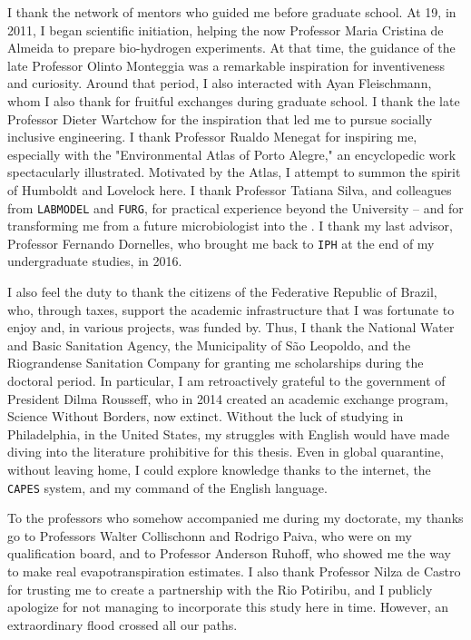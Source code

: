 \documentclass[./main_en.tex]{subfiles}
\begin{document}
\par I thank the network of mentors who guided me before graduate school. At 19, in 2011, I began scientific initiation, helping the now Professor Maria Cristina de Almeida to prepare bio-hydrogen experiments. At that time, the guidance of the late Professor Olinto Monteggia was a remarkable inspiration for inventiveness and curiosity. Around that period, I also interacted with Ayan Fleischmann, whom I also thank for fruitful exchanges during graduate school. I thank the late Professor Dieter Wartchow for the inspiration that led me to pursue socially inclusive engineering. I thank Professor Rualdo Menegat for inspiring me, especially with the "Environmental Atlas of Porto Alegre," an encyclopedic work spectacularly illustrated. Motivated by the Atlas, I attempt to summon the spirit of Humboldt and Lovelock here. I thank Professor Tatiana Silva, and colleagues from \texttt{LABMODEL} and \texttt{FURG}, for practical experience beyond the University -- and for transforming me from a future microbiologist into the . I thank my last advisor, Professor Fernando Dornelles, who brought me back to \texttt{IPH} at the end of my undergraduate studies, in 2016.

\par I also feel the duty to thank the citizens of the Federative Republic of Brazil, who, through taxes, support the academic infrastructure that I was fortunate to enjoy and, in various projects, was funded by. Thus, I thank the National Water and Basic Sanitation Agency, the Municipality of São Leopoldo, and the Riograndense Sanitation Company for granting me scholarships during the doctoral period. In particular, I am retroactively grateful to the government of President Dilma Rousseff, who in 2014 created an academic exchange program, Science Without Borders, now extinct. Without the luck of studying in Philadelphia, in the United States, my struggles with English would have made diving into the literature prohibitive for this thesis. Even in global quarantine, without leaving home, I could explore knowledge thanks to the internet, the \texttt{CAPES} system, and my command of the English language.

\par To the professors who somehow accompanied me during my doctorate, my thanks go to Professors Walter Collischonn and Rodrigo Paiva, who were on my qualification board, and to Professor Anderson Ruhoff, who showed me the way to make real evapotranspiration estimates. I also thank Professor Nilza de Castro for trusting me to create a partnership with the Rio Potiribu, and I publicly apologize for not managing to incorporate this study here in time. However, an extraordinary flood crossed all our paths.
\end{document}
